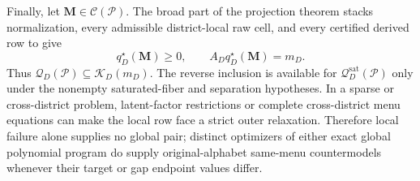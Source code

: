 Finally, let \(\mathbf M\in\mathcal C(\mathcal P)\). The broad part of the projection theorem stacks normalization, every admissible district-local raw cell, and every certified derived row to give
\[
q_D^\star(\mathbf M)\geq0,
\qquad A_Dq_D^\star(\mathbf M)=m_D.
\]
Thus \(\mathcal Q_D(\mathcal P)\subseteq\mathcal K_D(m_D)\). The reverse inclusion is available for \(\mathcal Q_D^{\mathrm{sat}}(\mathcal P)\) only under the nonempty saturated-fiber and separation hypotheses. In a sparse or cross-district problem, latent-factor restrictions or complete cross-district menu equations can make the local row face a strict outer relaxation. Therefore local failure alone supplies no global pair; distinct optimizers of either exact global polynomial program do supply original-alphabet same-menu countermodels whenever their target or gap endpoint values differ.